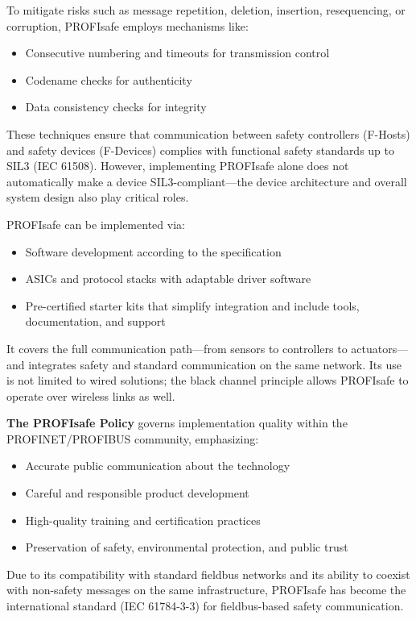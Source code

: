 \documentclass[conference]{IEEEtran}
\begin{document}
To mitigate risks such as message repetition, deletion, insertion, resequencing, or corruption, PROFIsafe employs mechanisms like:
\begin{itemize}
    \item Consecutive numbering and timeouts for transmission control
    \item Codename checks for authenticity
    \item Data consistency checks for integrity
\end{itemize}

These techniques ensure that communication between safety controllers (F-Hosts) and safety devices (F-Devices) complies with functional safety standards up to SIL3 (IEC 61508). However, implementing PROFIsafe alone does not automatically make a device SIL3-compliant—the device architecture and overall system design also play critical roles.

PROFIsafe can be implemented via:
\begin{itemize}
    \item Software development according to the specification
    \item ASICs and protocol stacks with adaptable driver software
    \item Pre-certified starter kits that simplify integration and include tools, documentation, and support
\end{itemize}

It covers the full communication path—from sensors to controllers to actuators—and integrates safety and standard communication on the same network. Its use is not limited to wired solutions; the black channel principle allows PROFIsafe to operate over wireless links as well.

\textbf{The PROFIsafe Policy} governs implementation quality within the PROFINET/PROFIBUS community, emphasizing:
\begin{itemize}
    \item Accurate public communication about the technology
    \item Careful and responsible product development
    \item High-quality training and certification practices
    \item Preservation of safety, environmental protection, and public trust
\end{itemize}

Due to its compatibility with standard fieldbus networks and its ability to coexist with non-safety messages on the same infrastructure, PROFIsafe has become the international standard (IEC 61784-3-3) for fieldbus-based safety communication.
\end{document}
